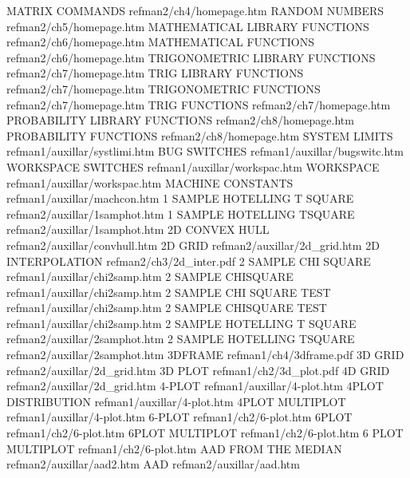 MATRIX COMMANDS                         refman2/ch4/homepage.htm
RANDOM NUMBERS                          refman2/ch5/homepage.htm
MATHEMATICAL LIBRARY FUNCTIONS          refman2/ch6/homepage.htm
MATHEMATICAL FUNCTIONS                  refman2/ch6/homepage.htm
TRIGONOMETRIC LIBRARY FUNCTIONS         refman2/ch7/homepage.htm
TRIG LIBRARY FUNCTIONS                  refman2/ch7/homepage.htm
TRIGONOMETRIC FUNCTIONS                 refman2/ch7/homepage.htm
TRIG FUNCTIONS                          refman2/ch7/homepage.htm
PROBABILITY LIBRARY FUNCTIONS           refman2/ch8/homepage.htm
PROBABILITY FUNCTIONS                   refman2/ch8/homepage.htm
SYSTEM LIMITS                           refman1/auxillar/systlimi.htm
BUG SWITCHES                            refman1/auxillar/bugswitc.htm
WORKSPACE SWITCHES                      refman1/auxillar/workspac.htm
WORKSPACE                               refman1/auxillar/workspac.htm
MACHINE CONSTANTS                       refman1/auxillar/machcon.htm
1 SAMPLE HOTELLING T SQUARE             refman2/auxillar/1samphot.htm
1 SAMPLE HOTELLING TSQUARE              refman2/auxillar/1samphot.htm
2D CONVEX HULL                          refman2/auxillar/convhull.htm
2D GRID                                 refman2/auxillar/2d_grid.htm
2D INTERPOLATION                        refman2/ch3/2d_inter.pdf
2 SAMPLE CHI SQUARE                     refman1/auxillar/chi2samp.htm
2 SAMPLE CHISQUARE                      refman1/auxillar/chi2samp.htm
2 SAMPLE CHI SQUARE TEST                refman1/auxillar/chi2samp.htm
2 SAMPLE CHISQUARE TEST                 refman1/auxillar/chi2samp.htm
2 SAMPLE HOTELLING T SQUARE             refman2/auxillar/2samphot.htm
2 SAMPLE HOTELLING TSQUARE              refman2/auxillar/2samphot.htm
3DFRAME                                 refman1/ch4/3dframe.pdf
3D GRID                                 refman2/auxillar/2d_grid.htm
3D PLOT                                 refman1/ch2/3d_plot.pdf
4D GRID                                 refman2/auxillar/2d_grid.htm
4-PLOT                                  refman1/auxillar/4-plot.htm
4PLOT DISTRIBUTION                      refman1/auxillar/4-plot.htm
4PLOT MULTIPLOT                         refman1/auxillar/4-plot.htm
6-PLOT                                  refman1/ch2/6-plot.htm
6PLOT                                   refman1/ch2/6-plot.htm
6PLOT MULTIPLOT                         refman1/ch2/6-plot.htm
6 PLOT MULTIPLOT                        refman1/ch2/6-plot.htm
AAD FROM THE MEDIAN                     refman2/auxillar/aad2.htm
AAD                                     refman2/auxillar/aad.htm
